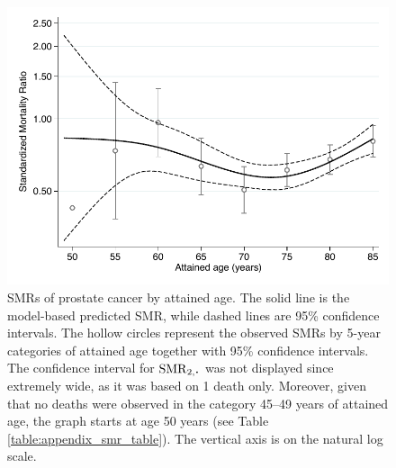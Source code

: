 \begin{figure}[p]
\centering
\includegraphics[width=\linewidth]{figures/smr_cage.pdf}
\caption[Standardized Mortality Ratio of prostate cancer by attained age]{SMRs of prostate cancer by attained age. The solid line is the model-based predicted SMR, while dashed lines are 95\% confidence intervals. The hollow circles represent the observed SMRs by 5-year categories of attained age together with 95\% confidence intervals. The confidence interval for $\SMR_{2, \LargerCdot}$ was not displayed since extremely wide, as it was based on 1 death only. Moreover, given that no deaths were observed in the category 45--49 years of attained age, the graph starts at age 50 years (see Table \ref{table:appendix_smr_table}). The vertical axis is on the natural log scale.}
\label{fig:appendix_smr_cage}
\end{figure}


